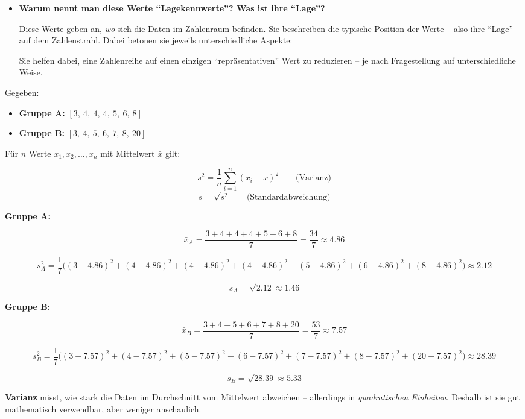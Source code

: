 \begin{aufgabe}{1}
\begin{itemize}
  \item \textbf{Warum nennt man diese Werte ``Lagekennwerte''? Was ist ihre ``Lage''?}

  Diese Werte geben an, \emph{wo} sich die Daten im Zahlenraum befinden. Sie beschreiben die typische Position der Werte – also ihre ``Lage'' auf dem Zahlenstrahl. Dabei betonen sie jeweils unterschiedliche Aspekte:

  Sie helfen dabei, eine Zahlenreihe auf einen einzigen ``repräsentativen'' Wert zu reduzieren – je nach Fragestellung auf unterschiedliche Weise.
\end{itemize}
\end{aufgabe}

\begin{aufgabe}{2}

Gegeben:

\begin{itemize}
  \item \textbf{Gruppe A:} $[3,\ 4,\ 4,\ 4,\ 5,\ 6,\ 8]$
  \item \textbf{Gruppe B:} $[3,\ 4,\ 5,\ 6,\ 7,\ 8,\ 20]$
\end{itemize}

Für $n$ Werte $x_1, x_2, \dots, x_n$ mit Mittelwert $\bar{x}$ gilt:

\[
s^2 = \frac{1}{n} \sum_{i=1}^{n} (x_i - \bar{x})^2 \qquad \text{(Varianz)}
\]
\[
s = \sqrt{s^2} \qquad \text{(Standardabweichung)}
\]

\textbf{Gruppe A:}

\[
\bar{x}_A = \frac{3 + 4 + 4 + 4 + 5 + 6 + 8}{7} = \frac{34}{7} \approx 4.86
\]

\[
s^2_A = \frac{1}{7} \big((3-4.86)^2 + (4-4.86)^2 + (4-4.86)^2 + (4-4.86)^2 + (5-4.86)^2 + (6-4.86)^2 + (8-4.86)^2\big) \approx 2.12
\]

\[
s_A = \sqrt{2.12} \approx 1.46
\]

\textbf{Gruppe B:}

\[
\bar{x}_B = \frac{3 + 4 + 5 + 6 + 7 + 8 + 20}{7} = \frac{53}{7} \approx 7.57
\]

\[
s^2_B = \frac{1}{7} \big((3-7.57)^2 + (4-7.57)^2 + (5-7.57)^2 + (6-7.57)^2 + (7-7.57)^2 + (8-7.57)^2 + (20-7.57)^2\big) \approx 28.39
\]

\[
s_B = \sqrt{28.39} \approx 5.33
\]

\textbf{Varianz} misst, wie stark die Daten im Durchschnitt vom Mittelwert abweichen – allerdings in \emph{quadratischen Einheiten}. Deshalb ist sie gut mathematisch verwendbar, aber weniger anschaulich.


\end{aufgabe}
